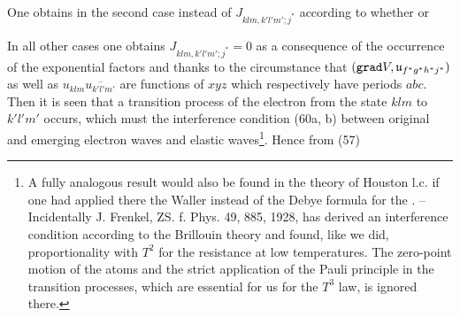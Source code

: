 \begin{paper}{1}
One obtains in the second case instead of $J_{klm,k'l'm';j^*}$
according to whether
or

In all other cases one obtains $J_{klm,k'l'm';j^*}=0$ as a consequence of the occurrence of the exponential factors and thanks to the circumstance that $(\texttt{grad}{V}, \mathfrak{u}_{f^*g^*h^*j^*})$ as well as $u_{klm}\overline{u_{k'l'm'}}$ are functions of $xyz$ which respectively have periods $abc$. Then it is seen that a transition process of the electron from the state $klm$ to $k'l'm'$ occurs, which must  the interference condition (60a, b) between original and emerging electron waves and  elastic waves\footnote{A fully analogous result would also be found in the theory of Houston l.c. if one had applied there the Waller instead of the Debye formula for the . -- Incidentally J. Frenkel, ZS. f. Phys. 49, 885, 1928, has derived an interference condition according to the Brillouin theory and found, like we did, proportionality with $T^2$ for the resistance at low temperatures. The zero-point motion of the atoms and the strict application of the Pauli principle in the transition processes, which are essential for us for the $T^3$ law, is ignored there.}. Hence from (57)
\end{paper}
